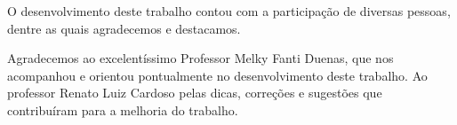 \begin{agradecimentos}
\parskip=0pt
    O desenvolvimento deste trabalho contou com a participação de diversas pessoas, dentre as quais agradecemos e destacamos. 
    
Agradecemos ao excelentíssimo Professor Melky Fanti Duenas, que nos acompanhou e orientou pontualmente no desenvolvimento deste trabalho. Ao professor Renato Luiz Cardoso pelas dicas, correções e sugestões que contribuíram para a melhoria do trabalho.

\end{agradecimentos}